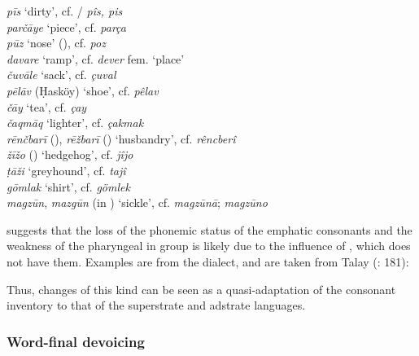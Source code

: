 \documentclass[output=paper]{langsci/langscibook}
\begin{document}
\ea
\noindent \textit{p\={i}s} `dirty', cf. / \textit{p\^{i}s, pis}\\
\textit{par\v{c}\={a}ye} `piece', cf.  \textit{par\c{c}a}\\
\textit{p\={u}z} `nose' (), cf.  \textit{poz}\\
\textit{davare} `ramp', cf.  \textit{dever} fem. `place'\\
\textit{\v{c}uv\={a}le} `sack', cf.  \textit{\c{c}uval} \\
\textit{pēlāv} (\d{H}ask\"{o}y) `shoe', cf.  \textit{p\^{e}lav}\\
\textit{\v{c}\={a}y} `tea', cf.  \textit{\c{c}ay}\\
\textit{\v{c}aqm\={a}q} `lighter', cf.  \textit{\c{c}akmak}\\
\textit{rēnčbarī} (), \textit{rē\v{z}barī} () `husbandry', cf.  \textit{rêncberî}\\
\textit{žīžo} () `hedgehog', cf.  \textit{jîjo} \\
\textit{ṭāži} `greyhound', cf.  \textit{tajî} \\
\textit{g\={o}mlak} `shirt', cf.  \textit{g\"{o}mlek}\\
\textit{magz\={u}n}, \textit{mazg\={u}n} (in ) `sickle', cf.  \textit{magz\={u}n\={a}};  \textit{magz\={u}no}\\
\z

\cite{Talay2007} suggests that the loss of the phonemic status of the {emphatic consonants} and the weakness of the {pharyngeal} in  group is likely due to the influence of , which does not have them. Examples are from the  dialect, and are taken from Talay (\citeyear{Talay2007}: 181):


Thus, changes of this kind can be seen as a quasi-adaptation of the consonant inventory to that of the {superstrate} and {adstrate} languages.

\subsubsection{Word-final devoicing}
\end{document}
